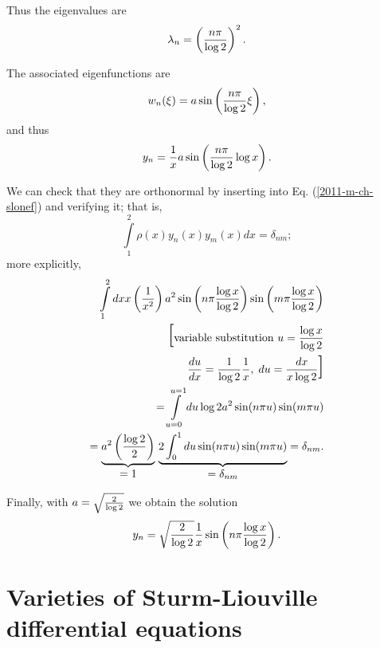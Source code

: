 {Thus the eigenvalues are
\begin{equation}
\lambda_n=
\left({n\pi\over\log2}\right)^2.
\end{equation}

The associated eigenfunctions are
\begin{equation}
w _n(\xi)=a\sin\left({n\pi\over\log2}
\xi\right),
\end{equation}
and thus
\begin{equation}
y_n={1\over x}a\sin\left({n\pi\over\log2}
\log x\right).
\end{equation}

We can check that they are orthonormal by inserting into Eq. (\ref{2011-m-ch-slonef})
and verifying it; that is,
\begin{equation}
\int\limits_1^2 \rho (x)y_n(x)
y_m(x)dx=\delta_{nm};
\end{equation}
more explicitly,
\begin{equation}
\begin{split}
\int\limits_1^2 dx x\left({1\over x^2}\right)a^2
   \sin\left(n\pi{\log x\over\log2}\right)\sin\left(m\pi
   {\log x\over\log2}\right)\\
 \textrm{\huge [} \textrm{variable substitution } u={\log x\over\log2}\\
    {du\over dx}=
{1\over\log2}{1\over x},\; du={dx\over x\log2} \textrm{\huge ]}\\
  =
\int\limits_{u=0}^{u=1}
  du\log2a^2\sin(n\pi u)\sin(m\pi u)\\
  =
\underbrace{a^2\left({\log2\over2}\right)}_{\mbox{$=1$}}\,
\underbrace{2 \int_0^1du \sin(n\pi u)\sin(m\pi
u)}_{\mbox{$=\delta_{nm}$}}
 = \delta_{nm}.
\end{split}
\end{equation}

Finally, with $a=\sqrt{2\over\log 2}$
we obtain the solution
\begin{equation}
y_n=\sqrt{2\over\log2}{1\over x}
\sin\left(n\pi{\log x\over\log2}\right).
\end{equation}

\eexample
}







\section{Varieties of Sturm-Liouville differential equations}

